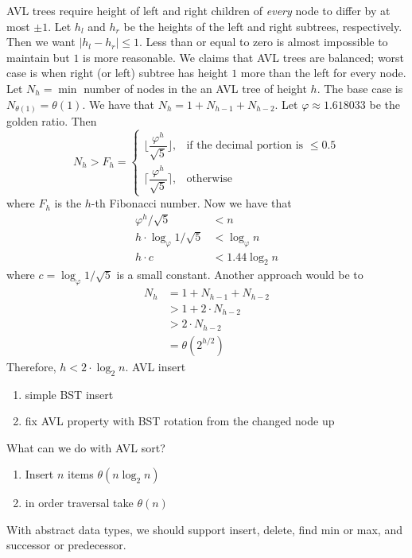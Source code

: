AVL trees require height of left and right children of \textit{every} node to differ by at most \(\pm 1\). Let
\(h_l\) and \(h_r\) be the heights of the left and right subtrees, respectively. Then we want 
\(\lvert h_l - h_r\rvert\leq 1\). Less than or equal to zero is almost impossible to maintain but \(1\) is
more reasonable. We claims that AVL trees are balanced; worst case is when right (or left) subtree has 
height \(1\) more than the left for every node. Let \(N_h = \min\) number of nodes in the an AVL tree of 
height \(h\). The base case is \(N_{\theta(1)} = \theta(1)\). We have that \(N_h = 1 + N_{h - 1} + N_{h - 2}\). 
Let \(\varphi \approx 1.618033\) be the golden ratio. Then
\[
	N_h > F_h = 
	\begin{cases}
		\Big\lfloor\dfrac{\varphi^h}{\sqrt{5}}\Big\rfloor, & \text{if the decimal portion is } \leq 0.5\\
		\Big\lceil\dfrac{\varphi^h}{\sqrt{5}}\Big\rceil, & \text{otherwise}
	\end{cases}
\]
where \(F_h\) is the \(h\)-th Fibonacci number. Now we have that
\begin{align*}
	\varphi^h / \sqrt{5} & < n\\
	h\cdot\log_{\varphi} 1 / \sqrt{5} & < \log_{\varphi} n \\
	h\cdot c & < 1.44\log_2 n
\end{align*}
where \(c = \log_{\varphi} 1 / \sqrt{5}\) is a small constant. Another approach would be to
\begin{align*}
	N_h & = 1 + N_{h - 1} + N_{h - 2}\\
	& > 1 + 2\cdot N_{h - 2}\\
	& > 2\cdot N_{h - 2}\\
	& = \theta(2^{h / 2})
\end{align*}
Therefore, \(h < 2\cdot \log_2 n\). AVL insert
\begin{enumerate}
	\item simple BST insert
	\item fix AVL property with BST rotation from the changed node up
\end{enumerate}
What can we do with AVL sort?
\begin{enumerate}[label=$\ast$]
	\item Insert \(n\) items \(\theta(n \log_2 n)\)
	\item in order traversal take \(\theta(n)\)
\end{enumerate}
With abstract data types, we should support insert, delete, find min or max, and successor or 
predecessor.



